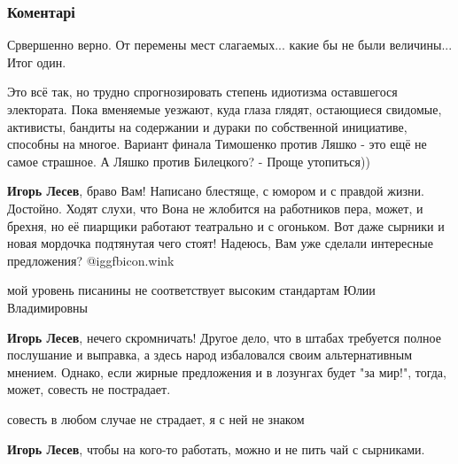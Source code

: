  
 
 
 
 
\subsubsection{Коментарі}

\begin{itemize} %
Срвершенно верно. От перемены мест слагаемых... какие бы не были величины... Итог один.


Это всё так, но трудно спрогнозировать степень идиотизма оставшегося
электората. Пока вменяемые уезжают, куда глаза глядят, остающиеся свидомые,
активисты, бандиты на содержании и дураки по собственной инициативе, способны
на многое. Вариант финала Тимошенко против Ляшко - это ещё не самое страшное. А
Ляшко против Билецкого? - Проще утопиться))


\textbf{Игорь Лесев}, браво Вам! Написано блестяще, с юмором и с правдой жизни. Достойно.
Ходят слухи, что Вона не жлобится на работников пера, может, и брехня, но её пиарщики работают театрально и с огоньком. Вот даже сырники и новая мордочка подтянутая чего стоят!
Надеюсь, Вам уже сделали интересные предложения?  @igg{fbicon.wink} 

\begin{itemize} %
мой уровень писанины не соответствует высоким стандартам Юлии Владимировны

\textbf{Игорь Лесев}, нечего скромничать! Другое дело, что в штабах требуется полное послушание и выправка, а здесь народ избаловался своим альтернативным мнением. Однако, если жирные предложения и в лозунгах будет "за мир!", тогда, может, совесть не пострадает.

совесть в любом случае не страдает, я с ней не знаком

\textbf{Игорь Лесев}, чтобы на кого-то работать, можно и не пить чай с сырниками.
\end{itemize} %



\end{itemize}
